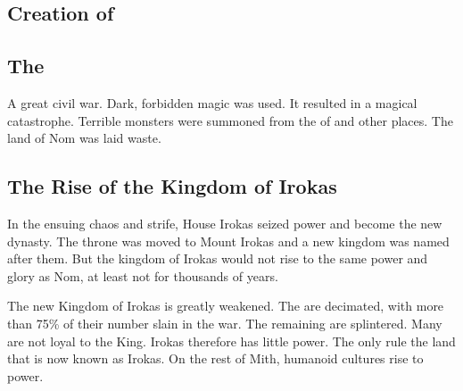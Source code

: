 





\subsection{Creation of \humans{}}



\subsection{The \FirstBanewar}
\label{\FirstBanewar}
A great civil war. Dark, forbidden magic was used. It resulted in a magical catastrophe. Terrible monsters were summoned from the \Baneworld{} of \Erebos{} and other places. The land of Nom was laid waste. 



\subsection{The Rise of the Kingdom of Irokas}
\label{Rise of Irokas}
In the ensuing chaos and strife, House Irokas seized power and become the new \DragonKing{} dynasty. The throne was moved to Mount Irokas and a new kingdom was named after them. But the kingdom of Irokas would not rise to the same power and glory as Nom, at least not for thousands of years. 

The new \Dragon{} Kingdom of Irokas is greatly weakened. The \dragons{} are decimated, with more than 75\% of their number slain in the war. The remaining \draconic{} \dragonhouses are splintered. Many are not loyal to the King. Irokas therefore has little power. The \dragons{} only rule the land that is now known as Irokas. On the rest of Mith, humanoid cultures rise to power. 

